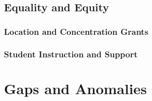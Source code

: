 \subsection{Equality and Equity}\indent%
\label{sec:equality_equity}

\subsubsection{Location and Concentration Grants}\indent%
\label{sec:tax-credit}

\subsubsection{Student Instruction and Support}\indent%
\label{student_instruction_support}

\section{Gaps and Anomalies}\indent%
\label{sec:findings-gaps-anomolies}



